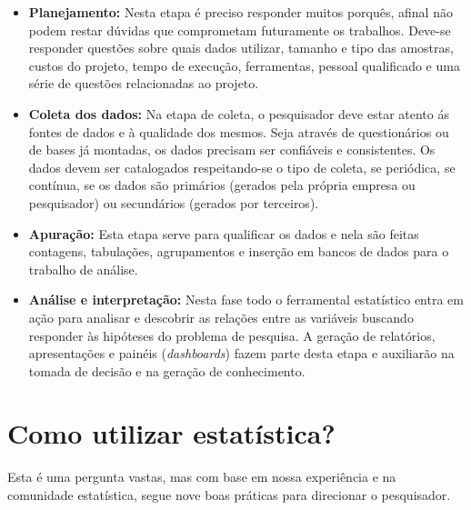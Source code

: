 \documentclass[12pt,]{style/krantz}
\theoremstyle{definition}
\theoremstyle{definition}
\theoremstyle{definition}
\theoremstyle{remark}
\begin{document}
\begin{itemize}
\item
  \textbf{Planejamento: } Nesta etapa é preciso responder muitos porquês, afinal não podem restar dúvidas que comprometam futuramente os trabalhos. Deve-se responder questões sobre quais dados utilizar, tamanho e tipo das amostras, custos do projeto, tempo de execução, ferramentas, pessoal qualificado e uma série de questões relacionadas ao projeto.
\item
  \textbf{Coleta dos dados: } Na etapa de coleta, o pesquisador deve estar atento ás fontes de dados e à qualidade dos mesmos. Seja através de questionários ou de bases já montadas, os dados precisam ser confiáveis e consistentes. Os dados devem ser catalogados respeitando-se o tipo de coleta, se periódica, se contínua, se os dados são primários (gerados pela própria empresa ou pesquisador) ou secundários (gerados por terceiros).
\item
  \textbf{Apuração: } Esta etapa serve para qualificar os dados e nela são feitas contagens, tabulações, agrupamentos e inserção em bancos de dados para o trabalho de análise.
\item
  \textbf{Análise e interpretação: } Nesta fase todo o ferramental estatístico entra em ação para analisar e descobrir as relações entre as variáveis buscando responder às hipóteses do problema de pesquisa. A geração de relatórios, apresentações e painéis (\emph{dashboards}) fazem parte desta etapa e auxiliarão na tomada de decisão e na geração de conhecimento.
\end{itemize}

\hypertarget{como-utilizar-estatistica}{%
\section{Como utilizar estatística?}\label{como-utilizar-estatistica}}

Esta é uma pergunta vastas, mas com base em nossa experiência e na comunidade estatística, segue nove boas práticas para direcionar o pesquisador.
\end{document}
